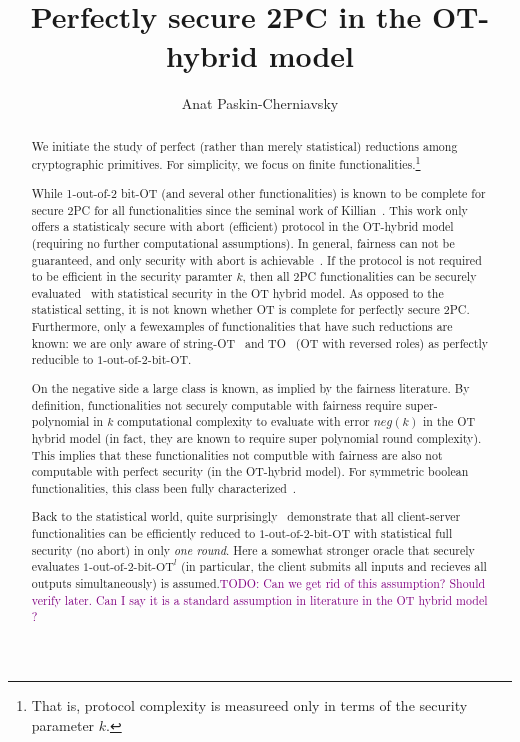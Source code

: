 \documentclass[a4paper]{article}
\title{Perfectly secure 2PC in the OT-hybrid model}
\author{Anat Paskin-Cherniavsky}
\newcommand{\OT}[2]{#1\text{-out-of-}#2\text{-bit-OT}}
\newcommand{\atodo}[1]{\textcolor{purple}{TODO: #1}}
\begin{document}
\maketitle

\begin{abstract}
We initiate the study of perfect (rather than merely statistical) reductions among cryptographic primitives. For simplicity, we focus on finite functionalities.\footnote{That is, protocol complexity is measureed only in terms of the security parameter $k$.}


While 1-out-of-2 bit-OT (and several other functionalities) is known to be complete for secure 2PC for all functionalities since the seminal work of Killian~\cite{Killian88}. This work only offers a statisticaly secure with abort (efficient) protocol in the OT-hybrid model (requiring no further computational assumptions). In general, fairness can not be guaranteed, and only security with abort is achievable~\cite{Cleve86}. If the protocol is not required to be efficient in the security paramter $k$, then all 2PC functionalities can be securely evaluated~\cite{GK10} with statistical security in the OT hybrid model.
As opposed to the statistical setting, it is not known whether OT is complete for perfectly secure 2PC. Furthermore, only a fewexamples of functionalities that have such reductions are known: we are only aware of string-OT~\cite{BCS96} and TO~\cite{WolfW06} (OT with reversed roles) as perfectly reducible to $\OT{1}{2}$.

On the negative side a large class is known, as implied by the fairness literature. By definition, functionalities not securely computable with fairness require super-polynomial in $k$ 
computational complexity to evaluate with error $neg(k)$ in the OT hybrid model (in fact, they are known to require super polynomial round complexity). 
This implies that these functionalities not computble with fairness are also not computable with perfect security (in the OT-hybrid model). For symmetric boolean functionalities, this class been fully characterized~\cite{}.

Back to the statistical world, quite surprisingly~\cite{IKOPS11} demonstrate that all client-server functionalities can be efficiently reduced to $\OT{1}{2}$ with statistical full security (no abort) in only \emph{one round}. Here a somewhat stronger oracle that securely evaluates ${\OT{1}{2}}^l$ (in particular, the client submits all inputs and recieves all outputs simultaneously) is assumed.\atodo{Can we get rid of this assumption? Should verify later. Can I say it is a standard assumption in literature in the OT hybrid model ?}


\end{abstract}
\end{document}

